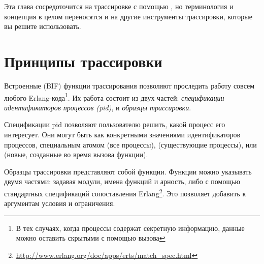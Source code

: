 Эта глава сосредоточится на трассировке с помощью , но терминология и концепция в целом переносятся и на другие инструменты трассировки, которые вы решите использовать.


\section{Принципы трассировки}
\label{sec:tracing-princples}

Встроенные (BIF) функции трассирования позволяют проследить работу совсем любого Erlang-кода\footnote{В тех случаях, когда процессы содержат секретную информацию, данные можно оставить скрытыми с помощью вызова }. Их работа состоит из двух частей: \emph{спецификации идентификаторов процессов (pid)}, и \emph{образцы трассировки}.

Спецификации pid позволяют пользователю решить, какой процесс его интересует. Они могут быть как конкретными значениями идентификаторов процессов, специальным атомом  (все процессы),  (существующие процессы), или  (новые, созданные во время вызова функции).

Образцы трассировки представляют собой функции. Функции можно указывать двумя частями: задавая модули, имена функций и арность, либо с помощью стандартных спецификаций сопоставления Erlang\footnote{\href{http://www.erlang.org/doc/apps/erts/match\_spec.html}{http://www.erlang.org/doc/apps/erts/match\_spec.html}}. Это позволяет добавить к аргументам условия и ограничения.

